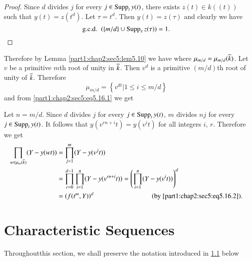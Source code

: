 \begin{proof}
  Since $d$ divides $j$ for every $j \in  \operatorname{Supp}_t y(t)$, there exists $z(t) \in k((t))$ such that $y(t)= z(t^d)$. Let $\tau = t^d$. Then $y(t)=z(\tau)$ and clearly we have
$$
\text{{g.c.d.}\kern.3em}~ (\{ m/d\} \cup \operatorname{Supp}_\tau z(\tau))=1.
$$
\end{proof}

Therefore by Lemma \ref{part1:chap2:sec5:lem5.10} we have
where $\mu_{m/d}= \mu_{m/d} (\overline{k})$. Let $v$ be a primitive $m$th  root of unity in $\overline{k}$. Then $v^d$ is a primitive $(m/d)$th root of unity of $\overline{k}$. Therefore
$$
\mu_{m/d} = \left\{ v^{di} \Big| 1 \leq i \leq m/d \right\}
$$ 
and from \ref{part1:chap2:sec5:eq5.16.1} we get

Let $n= m/d$. Since $d$ divides $j$ for every $j \in \operatorname{Supp}_t y(t)$, $m$ divides $nj$ for every $j \in \operatorname{Supp}_t y(t)$. It follows that $y(v^{rn+i}t) = y(v^i t)$ for all integers $i$, $r$. Therefore we get
\begin{align*}
  \prod_{w \in \mu_m (\ob{k})} (Y - y (wt)) & = \prod^m_{j=1} (Y- y(v^j t))\\
    & = \prod^{d-1}_{r=0} \prod^{n}_{i=1} (Y - y (v^{rn+i} t)) = \left(\prod_{i=1}^n (Y-y (v^i t)) \right)^d\\
    & = (f (t^m, Y))^d \hspace{3cm}{\text{(by \ref{part1:chap2:sec5:eq5.16.2}).}}
\end{align*}

\section{Characteristic Sequences}\label{part1:chap2:sec6}

Throughout\pageoriginale this section, we shall preserve the notation introduced in \ref{part1:chap2:sec6:ss6.1} below

\subsection{}\label{part1:chap2:sec6:ss6.1} 

